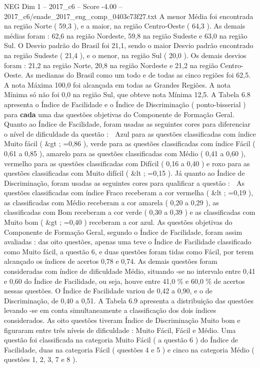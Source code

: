 \begin{textsample}{NEG Dim 1 – 2017\_c6 – Score -4.00 – 2017\_c6/enade\_2017\_eng\_comp\_0403c73f27.txt}
A menor Média foi encontrada na região Norte ( 59,3 ), e a maior, na região Centro-Oeste ( 64,3 ).
As demais médias foram : 62,6 na região Nordeste, 59,8 na região Sudeste e 63,0 na região Sul.
O Desvio padrão do Brasil foi 21,1, sendo o maior Desvio padrão encontrado na região Sudeste ( 21,4 ), e o menor, na região Sul ( 20,0 ).
Os demais desvios foram : 21,2 na região Norte, 20,8 na região Nordeste e 21,2 na região Centro-Oeste.
As medianas do Brasil como um todo e de todas as cinco regiões foi 62,5.
A nota Máxima 100,0 foi alcançada em todas as Grandes Regiões.
A nota Mínima só não foi 0,0 na região Sul, que obteve nota Mínima 12,5.
A Tabela 6.8 apresenta o Índice de Facilidade e o Índice de Discriminação ( ponto-bisserial ) para \textbf{cada} uma das questões objetivas do Componente de Formação Geral.
Quanto ao Índice de Facilidade, foram usadas as seguintes cores para diferenciar o nível de dificuldade da questão :  Azul para as questões classificadas com índice Muito fácil ( \&gt ; =0,86 ), verde para as questões classificadas com índice Fácil ( 0,61 a 0,85 ), amarelo para as questões classificadas com Médio ( 0,41 a 0,60 ), vermelho para as questões classificadas com Difícil ( 0,16 a 0,40 ) e roxo para as questões classificadas com Muito difícil ( \&lt ; =0,15 ).
Já quanto ao Índice de Discriminação, foram usadas as seguintes cores para qualificar a questão :  As questões classificadas com índice Fraco receberam a cor vermelha ( \&lt ; =0,19 ), as classificadas com Médio receberam a cor amarela ( 0,20 a 0,29 ), as classificadas com Bom receberam a cor verde ( 0,30 a 0,39 ) e as classificadas com Muito bom ( \&gt ; =0,40 ) receberam a cor azul.
As questões objetivas do Componente de Formação Geral, segundo o Índice de Facilidade, foram assim avaliadas : das oito questões, apenas uma teve o Índice de Facilidade classificado como Muito fácil, a questão 6, e duas questões foram tidas como Fácil, por terem alcançado os índices de acertos 0,78 e 0,74.
As demais questões foram consideradas com índice de dificuldade Médio, situando -se no intervalo entre 0,41 e 0,60 do Índice de Facilidade, ou seja, houve entre 41,0 \% e 60,0 \% de acertos nessas questões.
O Índice de Facilidade variou de 0,42 a 0,90, e o de Discriminação, de 0,40 a 0,51.
A Tabela 6.9 apresenta a distribuição das questões levando -se em conta simultaneamente a classificação dos dois índices considerados.
As oito questões tiveram Índice de Discriminação Muito bom e figuraram entre três níveis de dificuldade : Muito Fácil, Fácil e Médio.
Uma questão foi classificada na categoria Muito Fácil ( a questão 6 ) do Índice de Facilidade, duas na categoria Fácil ( questões 4 e 5 ) e cinco na categoria Médio ( questões 1, 2, 3, 7 e 8 ).

\end{textsample}
